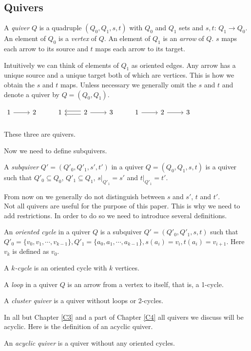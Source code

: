 \subsection{Quivers}
\begin{definition}
A \textit{quiver} $Q$ is a quadruple $(Q_0,Q_1,s,t)$ with $Q_0$ and $Q_1$ sets and $s,t$: $Q_1\rightarrow Q_0$. An element of $Q_0$ is a \textit{vertex} of $Q$. An element of $Q_1$ is an \textit{arrow} of $Q$. $s$ maps each arrow to its source and $t$ maps each arrow to its target.
\end{definition}
\indent Intuitively we can think of elements of $Q_1$ as oriented edges. Any arrow has a unique source and a unique target both of which are vertices. This is how we obtain the $s$ and $t$ maps. Unless necessary we generally omit the $s$ and $t$ and denote a quiver by $Q = (Q_0, Q_1)$.\\
\begin{example}
$\begin{tikzcd} 
1 \arrow[r] & 2 & 1 & 2 \arrow[l, shift right]\arrow[l, shift left]\arrow[r] & 3 & 1\arrow[r] & 2\arrow[r] & 3\\
\end{tikzcd}$\\
These three are quivers.
\end{example}
\indent Now we need to define subquivers.\\
\begin{definition}
A \textit{subquiver} $Q' = (Q'_0,Q'_1, s', t')$ in a quiver $Q = (Q_0,Q_1, s, t)$ is a quiver such that $Q'_0\subseteq Q_0$, $Q'_1\subseteq Q_1$, $s|_{Q'_1} = s'$ and $t|_{Q'_1} = t'$.
\end{definition}
\indent From now on we generally do not distinguish between $s$ and $s'$, $t$ and $t'$.\\
\indent Not all quivers are useful for the purpose of this paper. This is why we need to add restrictions. In order to do so we need to introduce several definitions.\\
\begin{definition}
An \textit{oriented cycle} in a quiver $Q$ is a subquiver $Q' = (Q'_0, Q'_1, s, t)$ such that $Q'_0 = \{v_0,v_1,\cdots, v_{k-1}\},Q'_1 = \{a_0,a_1,\cdots, a_{k-1}\}, s(a_i) = v_i, t(a_i) = v_{i+1}$. Here $v_k$ is defined as $v_0$.
\end{definition}
\begin{definition}
A \textit{$k$-cycle} is an oriented cycle with $k$ vertices.
\end{definition}
\begin{definition}
A \textit{loop} in a quiver $Q$ is an arrow from a vertex to itself, that is, a 1-cycle.
\end{definition}
\begin{definition}
A \textit{cluster quiver} is a quiver without loops or 2-cycles. 
\end{definition}
\indent In all but Chapter \ref{C3} and a part of Chapter \ref{C4} all quivers we discuss will be acyclic. Here is the definition of an acyclic quiver.\\
\begin{definition}
An \textit{acyclic quiver} is a quiver without any oriented cycles. 
\end{definition}
